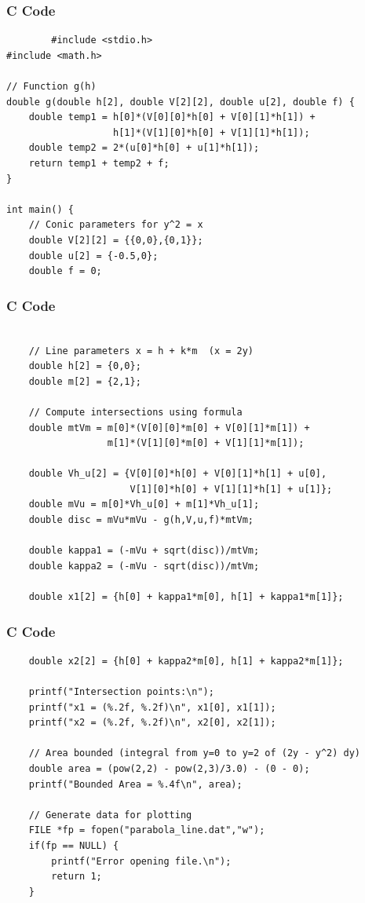 \documentclass{beamer}
\begin{document}
\begin{frame}[fragile]
\frametitle{C Code}
    \begin{lstlisting}
        #include <stdio.h>
#include <math.h>

// Function g(h)
double g(double h[2], double V[2][2], double u[2], double f) {
    double temp1 = h[0]*(V[0][0]*h[0] + V[0][1]*h[1]) + 
                   h[1]*(V[1][0]*h[0] + V[1][1]*h[1]);
    double temp2 = 2*(u[0]*h[0] + u[1]*h[1]);
    return temp1 + temp2 + f;
}

int main() {
    // Conic parameters for y^2 = x
    double V[2][2] = {{0,0},{0,1}};
    double u[2] = {-0.5,0};
    double f = 0;
   \end{lstlisting}
\end{frame}
\begin{frame}[fragile]
\frametitle{C Code}
    \begin{lstlisting}
 
    // Line parameters x = h + k*m  (x = 2y)
    double h[2] = {0,0};
    double m[2] = {2,1};

    // Compute intersections using formula
    double mtVm = m[0]*(V[0][0]*m[0] + V[0][1]*m[1]) +
                  m[1]*(V[1][0]*m[0] + V[1][1]*m[1]);

    double Vh_u[2] = {V[0][0]*h[0] + V[0][1]*h[1] + u[0],
                      V[1][0]*h[0] + V[1][1]*h[1] + u[1]};
    double mVu = m[0]*Vh_u[0] + m[1]*Vh_u[1];
    double disc = mVu*mVu - g(h,V,u,f)*mtVm;

    double kappa1 = (-mVu + sqrt(disc))/mtVm;
    double kappa2 = (-mVu - sqrt(disc))/mtVm;

    double x1[2] = {h[0] + kappa1*m[0], h[1] + kappa1*m[1]};
     \end{lstlisting}
\end{frame}
\begin{frame}[fragile]
\frametitle{C Code}
    \begin{lstlisting}
    double x2[2] = {h[0] + kappa2*m[0], h[1] + kappa2*m[1]};

    printf("Intersection points:\n");
    printf("x1 = (%.2f, %.2f)\n", x1[0], x1[1]);
    printf("x2 = (%.2f, %.2f)\n", x2[0], x2[1]);

    // Area bounded (integral from y=0 to y=2 of (2y - y^2) dy)
    double area = (pow(2,2) - pow(2,3)/3.0) - (0 - 0);
    printf("Bounded Area = %.4f\n", area);

    // Generate data for plotting
    FILE *fp = fopen("parabola_line.dat","w");
    if(fp == NULL) {
        printf("Error opening file.\n");
        return 1;
    }
 \end{lstlisting}
\end{frame}
\end{document}
